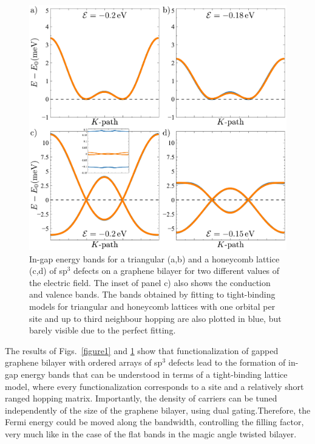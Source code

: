 \begin{figure}[h!]
\centering
\includegraphics{designer/figures/fig_bands.pdf}
\vspace{-15pt}
\caption{In-gap energy bands for a triangular (a,b) and a honeycomb lattice (c,d) of sp$^3$ defects on a graphene bilayer for two different values of the electric field. The inset of panel c) also shows the conduction and valence bands. The bands obtained by fitting to tight-binding models for triangular and honeycomb lattices with one orbital per site and up to third neighbour hopping are also plotted in blue, but barely visible due to the perfect fitting.}
\label{figure2}
\end{figure}





The results of Figs.~\ref{figure1} and \ref{figure2} show that functionalization of gapped graphene bilayer with ordered arrays of sp$^3$ defects lead to the formation of in-gap energy bands that can be understood in terms of a tight-binding lattice model, where every functionalization corresponds to a site and a relatively short ranged hopping matrix. 
Importantly, the density of carriers can be tuned independently of the size of the graphene bilayer, using dual gating\cite{Zhang2009,Taychatanapat2010}.Therefore, the Fermi energy could be moved along the bandwidth, controlling the filling factor, very much like in the case of the flat bands in the magic angle twisted bilayer\cite{Cao2018a,Cao2018b}. 

